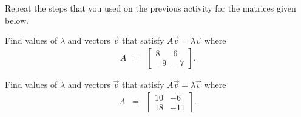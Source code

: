   \begin{problem}

  \item Repeat the steps that you used on the previous activity for
    the matrices given below.
    
    \begin{subproblem}
      
    \item Find values of $\lambda$ and vectors $\vec{v}$ that satisfy
      $A\vec{v}=\lambda\vec{v}$ where 
        \begin{eqnarray}
          A &  = & 
          \left[ \begin{array}{rr}
               8 &  6 \\
              -9 & -7
            \end{array} \right].
        \end{eqnarray}

        \vfill
        \clearpage


      \item Find values of $\lambda$ and vectors $\vec{v}$ that satisfy
        $A\vec{v}=\lambda\vec{v}$ where 
        \begin{eqnarray}
          A & = & 
          \left[ \begin{array}{rr}
              10 &  -6 \\
              18 & -11
            \end{array} \right].
        \end{eqnarray}

        \vfill
        \clearpage

    \end{subproblem}


\end{problem}

